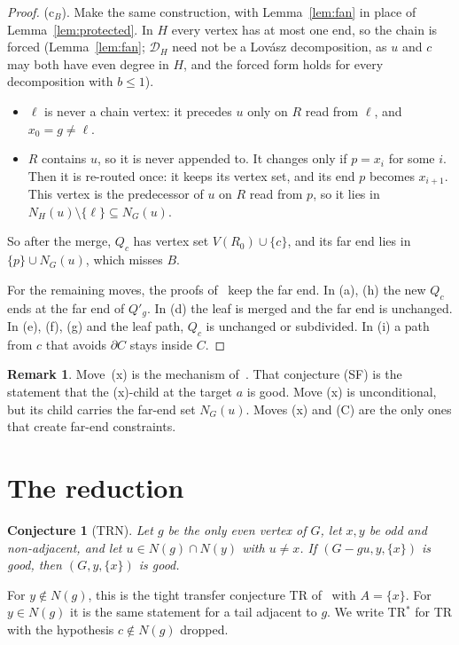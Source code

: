 \documentclass[11pt]{amsart}
\newtheorem{conjecture}[theorem]{Conjecture}
\theoremstyle{definition}
\newtheorem{remark}[theorem]{Remark}
\newcommand{\cD}{\mathcal D}
\newcommand{\lean}[1]{\quad{\footnotesize[Lean: \texttt{#1}]}}
\newcommand{\TRN}{\mathrm{TRN}}
\begin{document}
\begin{proof}
(c$_B$). Make the same construction, with Lemma~\ref{lem:fan} in place of
Lemma~\ref{lem:protected}. In $H$ every vertex has at most one end, so the chain is forced
(Lemma~\ref{lem:fan}; $\cD_H$ need not be a Lov\'asz decomposition, as $u$ and $c$ may both have
even degree in $H$, and the forced form holds for every decomposition with $b\le1$).
\begin{itemize}
\item $\ell$ is never a chain vertex: it precedes $u$ only on $R$ read from $\ell$, and $x_0=g\ne\ell$.
\item $R$ contains $u$, so it is never appended to. It changes only if $p=x_i$ for some $i$. Then it
is re-routed once: it keeps its vertex set, and its end $p$ becomes $x_{i+1}$. This vertex is the
predecessor of $u$ on $R$ read from $p$, so it lies in $N_H(u)\setminus\{\ell\}\subseteq N_G(u)$.
\end{itemize}
So after the merge, $Q_c$ has vertex set $V(R_0)\cup\{c\}$, and its far end lies in $\{p\}\cup
N_G(u)$, which misses $B$.

For the remaining moves, the proofs of~\cite[Thm.~3.1]{L1I} keep the far end. In (a), (h) the new
$Q_c$ ends at the far end of $Q'_g$. In (d) the leaf is merged and the far end is unchanged. In
(e), (f), (g) and the leaf path, $Q_c$ is unchanged or subdivided. In (i) a path from $c$ that
avoids $\partial C$ stays inside $C$.
\end{proof}

\begin{remark}
Move~(x) is the mechanism of~\cite[Prop.~9.5]{DL}. That conjecture (SF) is the statement that the
(x)-child at the target $a$ is good. Move (x) is unconditional, but its child carries the
far-end set $N_G(u)$. Moves (x) and (C) are the only ones that create far-end constraints.
\end{remark}

\section{The reduction}\label{sec:red}

\begin{conjecture}[$\TRN$]\label{conj:trn}
Let $g$ be the only even vertex of $G$, let $x,y$ be odd and non-adjacent, and let
$u\in N(g)\cap N(y)$ with $u\ne x$. If $(G-gu,y,\{x\})$ is good, then $(G,y,\{x\})$ is good.
\lean{TightTransferNOn}
\end{conjecture}

For $y\notin N(g)$, this is the tight transfer conjecture TR of~\cite[Conj.~4.1]{L1I} with $A=\{x\}$.
For $y\in N(g)$ it is the same statement for a tail adjacent to $g$. We write TR$^*$ for TR with
the hypothesis $c\notin N(g)$ dropped.
\end{document}
